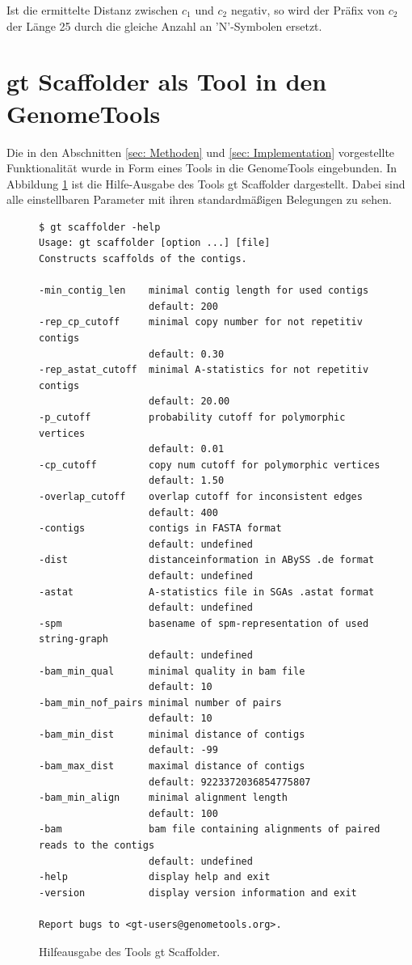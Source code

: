 \documentclass[a4paper,10pt,parskip]{scrartcl}
\begin{document}
Ist die ermittelte Distanz zwischen $c_1$ und $c_2$ negativ, so wird
der Präfix von $c_2$ der Länge 25 durch die gleiche Anzahl an
'N'-Symbolen ersetzt.

\section{gt Scaffolder als Tool in den GenomeTools}
Die in den Abschnitten \ref{sec: Methoden} und \ref{sec:
  Implementation} vorgestellte Funktionalität wurde in Form eines
Tools in die GenomeTools eingebunden. In Abbildung \ref{abb: help} ist
die Hilfe-Ausgabe des Tools gt Scaffolder dargestellt. Dabei sind alle
einstellbaren Parameter mit ihren standardmäßigen Belegungen zu sehen.

\begin{figure}
\begin{verbatim}
$ gt scaffolder -help
Usage: gt scaffolder [option ...] [file]
Constructs scaffolds of the contigs.

-min_contig_len    minimal contig length for used contigs
                   default: 200
-rep_cp_cutoff     minimal copy number for not repetitiv contigs
                   default: 0.30
-rep_astat_cutoff  minimal A-statistics for not repetitiv contigs
                   default: 20.00
-p_cutoff          probability cutoff for polymorphic vertices
                   default: 0.01
-cp_cutoff         copy num cutoff for polymorphic vertices
                   default: 1.50
-overlap_cutoff    overlap cutoff for inconsistent edges
                   default: 400
-contigs           contigs in FASTA format
                   default: undefined
-dist              distanceinformation in ABySS .de format
                   default: undefined
-astat             A-statistics file in SGAs .astat format
                   default: undefined
-spm               basename of spm-representation of used string-graph
                   default: undefined
-bam_min_qual      minimal quality in bam file
                   default: 10
-bam_min_nof_pairs minimal number of pairs
                   default: 10
-bam_min_dist      minimal distance of contigs
                   default: -99
-bam_max_dist      maximal distance of contigs
                   default: 9223372036854775807
-bam_min_align     minimal alignment length
                   default: 100
-bam               bam file containing alignments of paired reads to the contigs
                   default: undefined
-help              display help and exit
-version           display version information and exit

Report bugs to <gt-users@genometools.org>.
\end{verbatim}
\caption{\label{abb: help}Hilfeausgabe des Tools gt Scaffolder.}
\end{figure}
\end{document}
